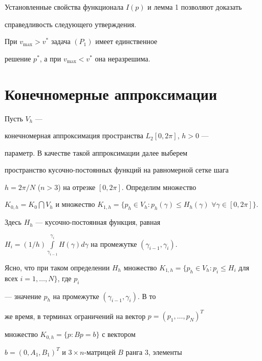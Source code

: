 Установленные свойства функционала $I(p)$ и лемма 1 позволяют доказать


справедливость следующего утверждения.





\begin{thm}


При $v_{\max}> v^{*}$ задача $(P_{1})$ имеет единственное


решение $p^{*}$, а при $v_{\max}<v^*$ она неразрешима. 


\end{thm}





\section{Конечномерные аппроксимации}





Пусть $V_h$ ---


конечномерная аппроксимация пространства $L_2[0,2\pi]$, $h>0$ ---


параметр. В качестве такой аппроксимации далее выберем


пространство кусочно-постоянных функций на равномерной сетке шага


$h=2\pi/N$ ($n>3$) на отрезке $[0, 2\pi]$. Определим множество


$K_{0,h}=K_0\bigcap V_h$ и множество $K_{1,h}=\{p_h\in V_h:


p_h(\gamma)\leq H_h(\gamma)$ $\forall \gamma \in [0,2 \pi]\}$.


Здесь $H_h$ --- кусочно-постоянная функция, равная


$H_i= (1/h) \int\limits_{\gamma_{i-1}}^{\gamma_{i}}


H(\gamma) d\gamma$ на промежутке $(\gamma_{i-1}, \gamma_{i})$.


Ясно, что при таком определении $H_h$ множество $K_{1,h}=\{p_h\in


V_h: p_i \leq H_i$ для всех $i=1,\dotsc,N \}$, где $p_i$


--- значение $p_h$ на промежутке $(\gamma_{i-1}, \gamma_{i})$. В то


же время, в терминах ограничений на вектор $p=(p_1,\dotsc,p_N)^T$


множество $K_{0,h}=\{p: Bp=b\}$ с вектором


$b=(0, A_1, B_1)^T$ и $3\times n$-матрицей $B$ ранга 3, элементы


